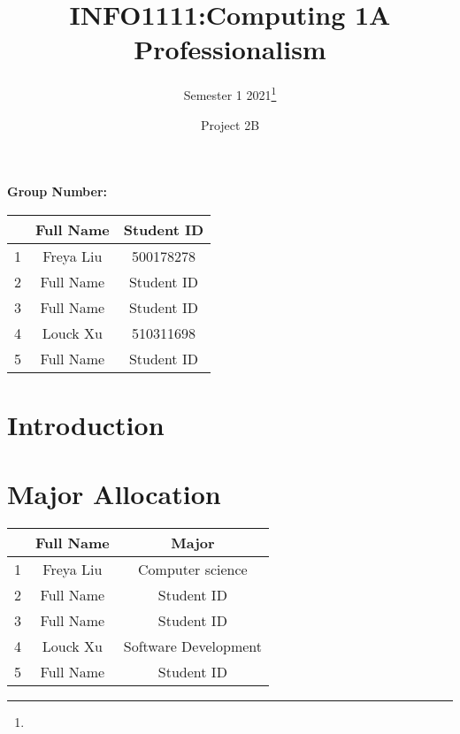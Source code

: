 \documentclass{article}
\title{INFO1111:Computing 1A Professionalism}
\author{Semester 1 2021\thanks{}}
\date{Project 2B}
\begin{document}
	
	
	\begin{titlepage}
		\maketitle
		\begin{title}
			\begin{center}
				\textbf{Group Number:}
			\end{center}
		\end{title}
		\begin{center}
			
			\begin{tabular}{|c|c|c|}
				\hline &Full Name& Student ID\\
				\hline 1& Freya Liu & 500178278  \\
				\hline 2&Full Name& Student ID  \\
				\hline 3&Full Name& Student ID  \\
				\hline 4&Louck Xu& 510311698  \\
				\hline 5&Full Name& Student ID  \\
				\hline
			\end{tabular}
		\end{center}
	\end{titlepage}
	
	\section{Introduction}
	
	\section{Major Allocation}
	\begin{center}
		\begin{larger}
			\begin{tabular}{|c|c|c|}
				\hline &Full Name& Major\\
				\hline 1& Freya Liu & Computer science  \\
				\hline 2&Full Name& Student ID  \\
				\hline 3&Full Name& Student ID  \\
				\hline 4& Louck Xu & Software Development  \\
				\hline 5&Full Name& Student ID  \\
				\hline
			\end{tabular}
		\end{larger}
	\end{center}
	
\end{document}
